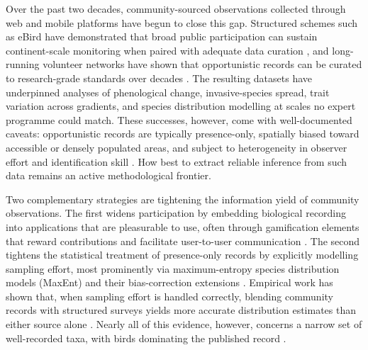 \documentclass[11pt]{article}
\begin{document}
Over the past two decades, community-sourced observations collected through web and mobile platforms have begun to close this gap. Structured schemes such as eBird have demonstrated that broad public participation can sustain continent-scale monitoring when paired with adequate data curation \citep{sullivan2009ebird,bonney2009citizen,chandler2017contribution}, and long-running volunteer networks have shown that opportunistic records can be curated to research-grade standards over decades \citep{pocock2015brc}. The resulting datasets have underpinned analyses of phenological change, invasive-species spread, trait variation across gradients, and species distribution modelling at scales no expert programme could match. These successes, however, come with well-documented caveats: opportunistic records are typically presence-only, spatially biased toward accessible or densely populated areas, and subject to heterogeneity in observer effort and identification skill \citep{isaac2014statistics,feldman2021trends,kendal2020citybias}. How best to extract reliable inference from such data remains an active methodological frontier.

Two complementary strategies are tightening the information yield of community observations. The first widens participation by embedding biological recording into applications that are pleasurable to use, often through gamification elements that reward contributions and facilitate user-to-user communication \citep{bonney2009citizen,chandler2017contribution}. The second tightens the statistical treatment of presence-only records by explicitly modelling sampling effort, most prominently via maximum-entropy species distribution models (MaxEnt) and their bias-correction extensions \citep{phillips2006maxent,phillips2008maxentextensions,phillips2009samplebias,elith2011statistical}. Empirical work has shown that, when sampling effort is handled correctly, blending community records with structured surveys yields more accurate distribution estimates than either source alone \citep{johnston2018estimates,johnston2021analytical,robinson2020integrating,steen2019stringent,milanesi2020observer}. Nearly all of this evidence, however, concerns a narrow set of well-recorded taxa, with birds dominating the published record \citep{feldman2021trends}.
\end{document}

